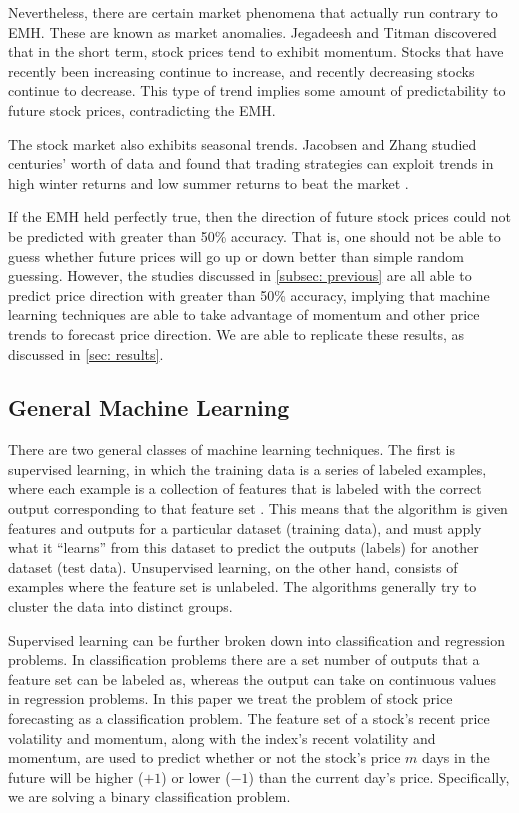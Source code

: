 \documentclass[pageno]{jpaper}
\begin{document}
Nevertheless, there are certain market phenomena that actually run contrary to EMH. These are known as market anomalies. Jegadeesh and Titman discovered that in the short term, stock prices tend to exhibit momentum\cite{jegadeesh}. Stocks that have recently been increasing continue to increase, and recently decreasing stocks continue to decrease. This type of trend implies some amount of predictability to future stock prices, contradicting the EMH. 

The stock market also exhibits seasonal trends. Jacobsen and Zhang studied centuries' worth of data and found that trading strategies can exploit trends in high winter returns and low summer returns to beat the market \cite{jacobsen2}\cite{jacobsen1}.

If the EMH held perfectly true, then the direction of future stock prices could not be predicted with greater than 50\% accuracy. That is, one should not be able to guess whether future prices will go up or down better than simple random guessing. However, the studies discussed in \ref{subsec: previous} are all able to predict price direction with greater than 50\% accuracy, implying that machine learning techniques are able to take advantage of momentum and other price trends to forecast price direction. We are able to replicate these results, as discussed in \ref{sec: results}.

\subsection{General Machine Learning}
There are two general classes of machine learning techniques. The first is supervised learning, in which the training data is a series of labeled examples, where each example is a collection of features that is labeled with the correct output corresponding to that feature set \cite{brownlee}. This means that the algorithm is given features and outputs for a particular dataset (training data), and must apply what it ``learns'' from this dataset to predict the outputs (labels) for another dataset (test data). Unsupervised learning, on the other hand, consists of examples where the feature set is unlabeled. The algorithms generally try to cluster the data into distinct groups.

Supervised learning can be further broken down into classification and regression problems. In classification problems there are a set number of outputs that a feature set can be labeled as, whereas the output can take on continuous values in regression problems. In this paper we treat the problem of stock price forecasting as a classification problem. The feature set of a stock's recent price volatility and momentum, along with the index's recent volatility and momentum, are used to predict whether or not the stock's price $m$ days in the future will be higher ($+1$) or lower ($-1$) than the current day's price. Specifically, we are solving a binary classification problem.
\end{document}
